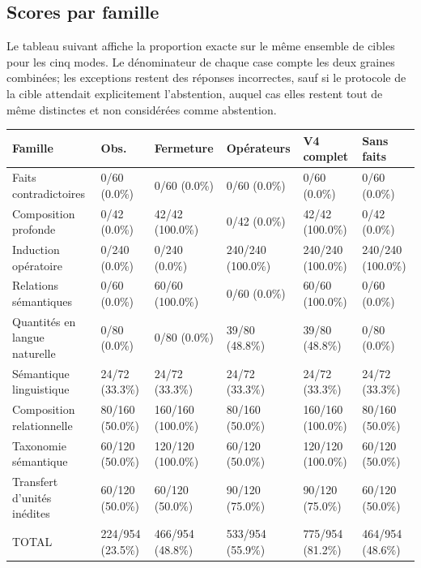 \documentclass[11pt,a4paper]{article}
\begin{document}
\subsection{Scores par famille}
Le tableau suivant affiche la proportion exacte sur le même ensemble de cibles pour les cinq modes. Le dénominateur de chaque case compte les deux graines combinées; les exceptions restent des réponses incorrectes, sauf si le protocole de la cible attendait explicitement l’abstention, auquel cas elles restent tout de même distinctes et non considérées comme abstention.
\scriptsize\setlength{\tabcolsep}{1.5pt}
\begin{longtable}{p{}p{}p{}p{}p{}p{}}
\toprule Famille & Obs. & Fermeture & Opérateurs & V4 complet & Sans faits \\
\midrule

Faits contradictoires & 0/60 (0.0\%) & 0/60 (0.0\%) & 0/60 (0.0\%) & 0/60 (0.0\%) & 0/60 (0.0\%) \\
Composition profonde & 0/42 (0.0\%) & 42/42 (100.0\%) & 0/42 (0.0\%) & 42/42 (100.0\%) & 0/42 (0.0\%) \\
Induction opératoire & 0/240 (0.0\%) & 0/240 (0.0\%) & 240/240 (100.0\%) & 240/240 (100.0\%) & 240/240 (100.0\%) \\
Relations sémantiques & 0/60 (0.0\%) & 60/60 (100.0\%) & 0/60 (0.0\%) & 60/60 (100.0\%) & 0/60 (0.0\%) \\
Quantités en langue naturelle & 0/80 (0.0\%) & 0/80 (0.0\%) & 39/80 (48.8\%) & 39/80 (48.8\%) & 0/80 (0.0\%) \\
Sémantique linguistique & 24/72 (33.3\%) & 24/72 (33.3\%) & 24/72 (33.3\%) & 24/72 (33.3\%) & 24/72 (33.3\%) \\
Composition relationnelle & 80/160 (50.0\%) & 160/160 (100.0\%) & 80/160 (50.0\%) & 160/160 (100.0\%) & 80/160 (50.0\%) \\
Taxonomie sémantique & 60/120 (50.0\%) & 120/120 (100.0\%) & 60/120 (50.0\%) & 120/120 (100.0\%) & 60/120 (50.0\%) \\
Transfert d’unités inédites & 60/120 (50.0\%) & 60/120 (50.0\%) & 90/120 (75.0\%) & 90/120 (75.0\%) & 60/120 (50.0\%) \\
TOTAL & 224/954 (23.5\%) & 466/954 (48.8\%) & 533/954 (55.9\%) & 775/954 (81.2\%) & 464/954 (48.6\%) \\
\bottomrule
\end{longtable}
\normalsize\setlength{\tabcolsep}{6pt}
\end{document}
